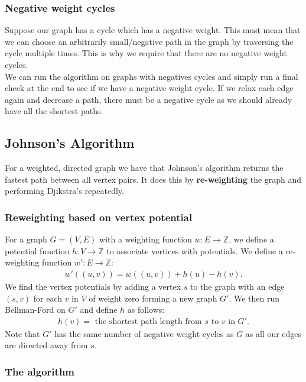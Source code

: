 \documentclass[a4paper, 12pt, twoside]{article}
\begin{document}
\subsubsection{Negative weight cycles}

Suppose our graph has a cycle which has a negative weight. 
This must mean that we can choose an arbitrarily small/negative 
path in the graph by traversing the cycle multiple times.
This is why we require that there are no negative weight cycles.
\\[\baselineskip]
We can run the algorithm on graphs with negatives cycles and
simply run a final check at the end to see if we have a negative weight cycle.
If we relax each edge again and decrease a path, there must be a negative cycle
as we should already have all the shortest paths.

\newpage

\subsection{Johnson's Algorithm}

For a weighted, directed graph we have that Johnson's algorithm 
returns the fastest path between all vertex pairs. It does this 
by \textbf{re-weighting} the graph and performing Djikstra's
repeatedly.

\subsubsection{Reweighting based on vertex potential}

For a graph $G = (V, E)$ with a weighting function $w : E \to \mathbb{Z}$, 
we define a potential function $h : V \to \mathbb{Z}$ to associate vertices with 
potentials. We define a re-weighting function $w' : E \to \mathbb{Z}$: \begin{gather*}
  w'((u, v)) = w((u, v)) + h(u) - h(v).
\end{gather*} We find the vertex potentials by adding a vertex $s$ to the graph with
an edge $(s, v)$ for each $v$ in $V$ of weight zero forming a new graph $G'$. 
We then run Bellman-Ford on $G'$ and define $h$ as follows: \begin{gather*}
  h(v) = \text{ the shortest path length from $s$ to $v$ in } G'.
\end{gather*} Note that $G'$ has the same number of negative weight cycles as $G$
as all our edges are directed away from $s$.

\subsubsection{The algorithm}
\end{document}
